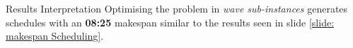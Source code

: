 \documentclass[handout]{beamer}
\begin{document}
\begin{frame}
\begin{figure}
\endminipage\hfill
{}%
 
\endminipage

\end{figure}
    
        \begin{block}{Results Interpretation}
		Optimising the problem in \textit{wave sub-instances} generates schedules with an \textbf{08:25} makespan similar to the results seen in slide \ref{slide: makespan Scheduling}.
	\end{block}
    	\vspace{\baselineskip}
    	\vspace{\baselineskip}
\end{frame}

\end{document}
